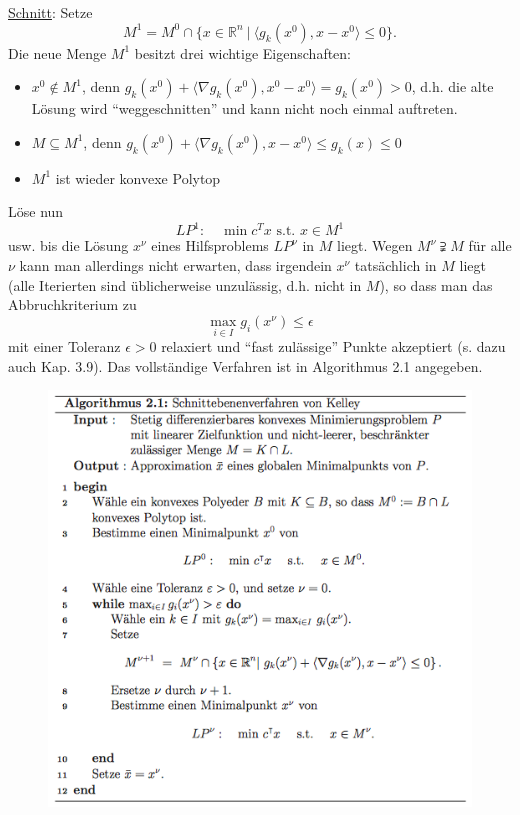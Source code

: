 \documentclass[12pt]{extreport} %
\newcommand{\R}{\mathbb{R}}
\theoremstyle{named}
\theoremstyle{nnamed}
\theoremstyle{itshape}
\theoremstyle{normal}
\begin{document}
\underline{Schnitt}: Setze
	$$ M^1 = M^0 \cap \big\{ x \in \R^n ~|~ \langle g_k(x^0), x - x^0 \rangle \leq 0 \big\}. $$
Die neue Menge $M^1$ besitzt drei wichtige Eigenschaften:
\begin{itemize}
	\item $x^0 \notin M^1$, denn $g_k(x^0) + \langle \nabla g_k(x^0), x^0 - x^0 \rangle = g_k(x^0) > 0$, d.h. die alte Lösung wird \enquote{weggeschnitten} und kann nicht noch einmal auftreten.
	\item $M \subseteq M^1$, denn $g_k(x^0) + \langle \nabla g_k(x^0), x - x^0 \rangle \leq g_k(x) \leq 0$
	\item $M^1$ ist wieder konvexe Polytop
\end{itemize}

Löse nun
$$ LP^1: \quad \min c^T x \text{ s.t. } x \in M^1 $$
usw. bis die Lösung $x^\nu$ eines Hilfsproblems $LP^\nu$ in $M$ liegt. Wegen $M^\nu \supsetneqq  M$ für alle $\nu$ kann man allerdings nicht erwarten, dass irgendein $x^\nu$ tatsächlich in $M$ liegt (alle Iterierten sind üblicherweise unzulässig, d.h. nicht in $M$), so dass man das Abbruchkriterium zu 
	$$ \max_{i \in I} g_i(x^\nu) \leq \epsilon $$
 mit einer Toleranz $\epsilon > 0$ relaxiert und \enquote{fast zulässige} Punkte akzeptiert (s. dazu auch Kap. 3.9). Das vollständige Verfahren ist in Algorithmus 2.1 angegeben.

\begin{figure}[h!] \centering
	\includegraphics[scale=0.55]{img/vl-alg-21}
\end{figure}
\end{document}
